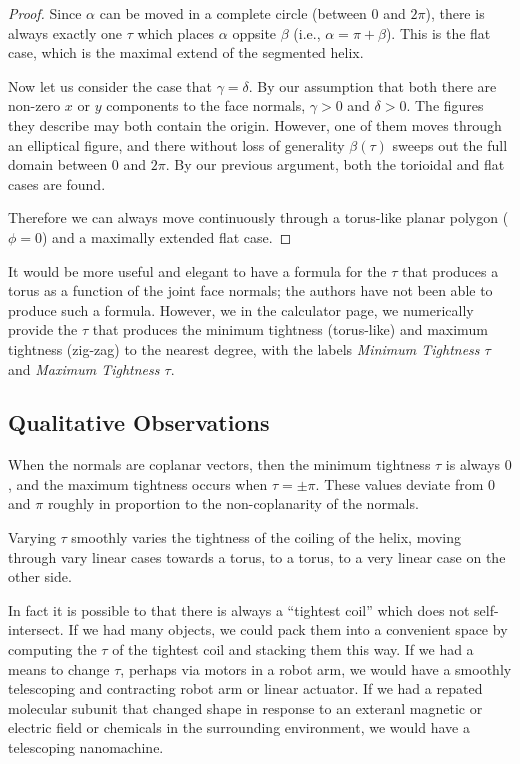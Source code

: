 \documentclass[11pt]{article}
\begin{document}
{\begin{proof}
    Since $\alpha$ can be moved in a complete circle (between 0 and
    $2\pi$), there is always
    exactly one
    $\tau$ which places $\alpha$ oppsite $\beta$
    (i.e., $\alpha = \pi + \beta$). This is the flat case, which
    is the maximal extend of the segmented helix.

    Now let us consider the case that $\gamma = \delta$.
    By our assumption that both there are non-zero $x$ or $y$ components
    to the face normals, $\gamma > 0$ and $\delta > 0$. The figures
    they describe may both contain the origin. However, one of them
    moves through an elliptical figure, and there without loss of
    generality $\beta(\tau)$ sweeps out the full domain between $0$ and
    $2\pi$. By our previous argument, both the torioidal and flat cases
    are found.

    Therefore we can always move continuously through a torus-like
    planar polygon ($\phi = 0$) and a maximally extended flat case.

\end{proof}


It would be more useful and elegant to have a formula for the $\tau$ that produces
a torus as a function of the joint face normals; the authors have not been able
to produce such a formula. However, we in the calculator page, we numerically
provide the $\tau$ that produces the minimum tightness (torus-like) and maximum tightness (zig-zag) to the
nearest degree,
with the labels {\em Minimum Tightness $\tau$} and {\em Maximum Tightness $\tau$}.

\subsection{Qualitative Observations}

When the normals are coplanar vectors, then the minimum tightness $\tau$ is
always $0$, and the maximum tightness occurs when $\tau = \pm \pi$.
These values deviate from $0$ and $\pi$ roughly in proportion
to the non-coplanarity of the normals.

Varying $\tau$ smoothly varies the tightness of the coiling of the helix,
moving through vary linear cases towards a torus,
to a torus, to a very linear case on the other side.

In fact it is possible to that there is always a ``tightest coil''
which does not self-intersect. If we had many objects,
we could pack them into a convenient space by computing the $\tau$
of the tightest coil and stacking them this way.
If we had a means to change $\tau$, perhaps via motors in a robot arm,
we would have a smoothly telescoping and contracting
robot arm or linear actuator.
If we had a repated molecular subunit that changed shape in
response to an exteranl magnetic or electric field or chemicals in the surrounding
environment, we would have a telescoping nanomachine.


}
\end{document}
